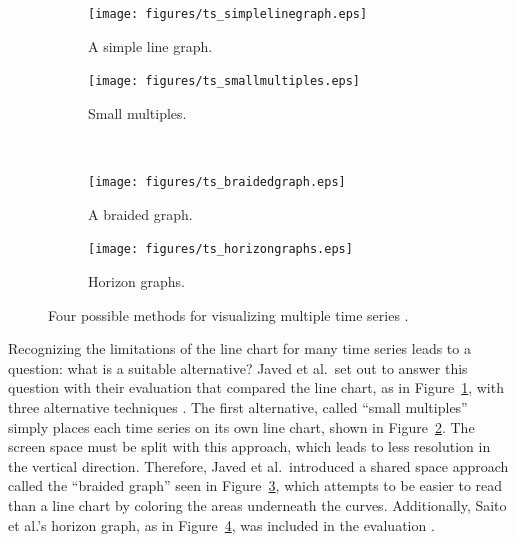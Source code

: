 \documentclass{article}
\begin{document}
\begin{figure}
        \centering
        \begin{subfigure}[b]{0.4\textwidth}
                \texttt{[image: figures/ts\_simplelinegraph.eps]}
                \caption{A simple line graph.}
                \label{fig:ts_simple}
        \end{subfigure}
        \begin{subfigure}[b]{0.4\textwidth}
                \texttt{[image: figures/ts\_smallmultiples.eps]}
                \caption{Small multiples.}
                \label{fig:ts_smmult}
        \end{subfigure}
        \\
        \begin{subfigure}[b]{0.4\textwidth}
                \texttt{[image: figures/ts\_braidedgraph.eps]}
                \caption{A braided graph.}
                \label{fig:ts_braid}
        \end{subfigure}
        \begin{subfigure}[b]{0.4\textwidth}
                \texttt{[image: figures/ts\_horizongraphs.eps]}
                \caption{Horizon graphs.}
                \label{fig:ts_horizon}
        \end{subfigure}
        \caption{Four possible methods for visualizing multiple time series \cite{javed2010}.}
        \label{fig:ts_compare}
\end{figure}

Recognizing the limitations of the line chart for many time series leads to a question: what is a suitable alternative?  Javed et al.\ set out to answer this question with their evaluation that compared the line chart, as in Figure~\ref{fig:ts_simple}, with three alternative techniques  \cite{javed2010}.  The first alternative, called ``small multiples'' simply places each time series on its own line chart, shown in Figure~\ref{fig:ts_smmult}.  The screen space must be split with this approach, which leads to less resolution in the vertical direction.  Therefore, Javed et al.\ introduced a shared space approach called the ``braided graph'' seen in Figure~\ref{fig:ts_braid}, which attempts to be easier to read than a line chart by coloring the areas underneath the curves.  Additionally, Saito et al.'s horizon graph, as in Figure~\ref{fig:ts_horizon}, was included in the evaluation \cite{saito2005}.
\end{document}
